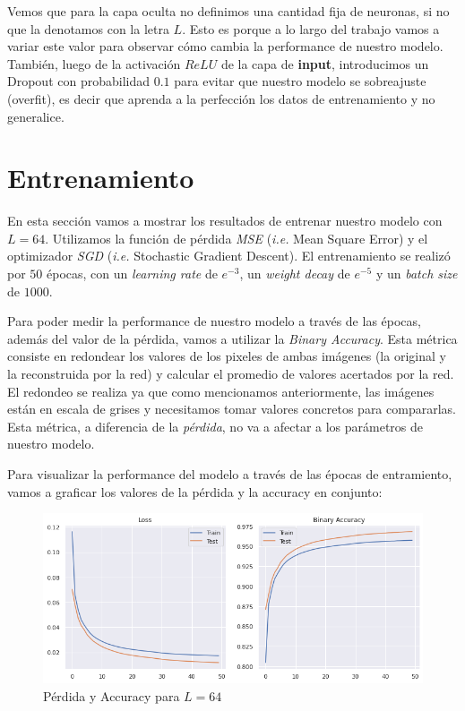 \documentclass[a4paper,12pt,oneside,final]{article}
\begin{document}
Vemos que para la capa oculta no definimos una cantidad fija de neuronas, si no que la denotamos con la letra $L$. Esto es porque a lo largo del trabajo vamos a variar este valor para observar cómo cambia la performance de nuestro modelo. También, luego de la activación $ReLU$ de la capa de {\bf input}, introducimos un Dropout con probabilidad $0.1$ para evitar que nuestro modelo se sobreajuste (overfit), es decir que aprenda a la perfección los datos de entrenamiento y no generalice.

\section{Entrenamiento}

En esta sección vamos a mostrar los resultados de entrenar nuestro modelo con $L = 64$. Utilizamos la función de pérdida {\it MSE} ({\it i.e.} Mean Square Error) y el optimizador {\it SGD} ({\it i.e.} Stochastic Gradient Descent). El entrenamiento se realizó por $50$ épocas, con un {\it learning rate} de $e^{-3}$, un {\it weight decay} de $e^{-5}$ y un {\it batch size} de $1000$.

Para poder medir la performance de nuestro modelo a través de las épocas, además del valor de la pérdida, vamos a utilizar la {\it Binary Accuracy}. Esta métrica consiste en redondear los valores de los pixeles de ambas imágenes (la original y la reconstruida por la red) y calcular el promedio de valores acertados por la red. El redondeo se realiza ya que como mencionamos anteriormente, las imágenes están en escala de grises y necesitamos tomar valores concretos para compararlas. Esta métrica, a diferencia de la {\it pérdida}, no va a afectar a los parámetros de nuestro modelo.

Para visualizar la performance del modelo a través de las épocas de entramiento, vamos a graficar los valores de la pérdida y la accuracy en conjunto:

\begin{figure}[ht]
  \centering
  \includegraphics[width=15cm,keepaspectratio]{./graficos/training_metrics.png}
  \caption{Pérdida y Accuracy para $L=64$}\label{training_metrics}
\end{figure}
\end{document}
